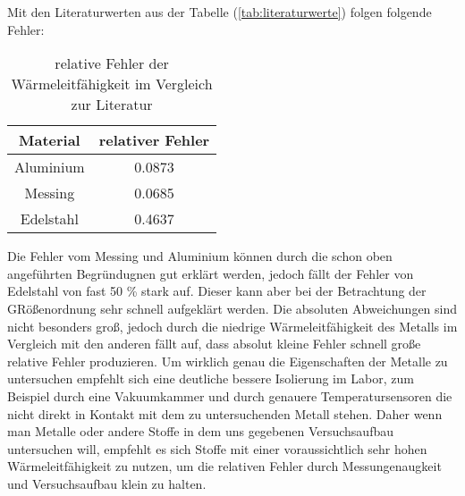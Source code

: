 Mit den Literaturwerten aus der Tabelle (\ref{tab:literaturwerte}) folgen folgende Fehler:

\begin{table}
\centering
\begin{tabular}{c c}
\toprule
{Material} &{relativer Fehler}\\
\midrule
Aluminium & 0.0873 \\
Messing   & 0.0685 \\
Edelstahl & 0.4637 \\
\bottomrule
\end{tabular}
\caption{relative Fehler der Wärmeleitfähigkeit im Vergleich zur Literatur}
\label{tab:Fehler}
\end{table}

\noindent
Die Fehler vom Messing und Aluminium können durch die schon oben angeführten Begründugnen gut erklärt werden, jedoch fällt der Fehler von Edelstahl von fast 50 \% stark auf. Dieser kann aber 
bei der Betrachtung der GRößenordnung sehr schnell aufgeklärt werden. Die absoluten Abweichungen sind nicht besonders groß, jedoch durch die niedrige Wärmeleitfähigkeit des Metalls im Vergleich 
mit den anderen fällt auf, dass absolut kleine Fehler schnell große relative Fehler produzieren. 
Um wirklich genau die Eigenschaften der Metalle zu untersuchen empfehlt sich eine deutliche bessere Isolierung im Labor, zum Beispiel durch eine Vakuumkammer und durch genauere Temperatursensoren
die nicht direkt in Kontakt mit dem zu untersuchenden Metall stehen.
\noindent
Daher wenn man Metalle oder andere Stoffe in dem uns gegebenen Versuchsaufbau untersuchen will, empfehlt es sich Stoffe mit einer voraussichtlich sehr hohen Wärmeleitfähigkeit zu nutzen, um die 
relativen Fehler durch Messungenaugkeit und Versuchsaufbau klein zu halten.